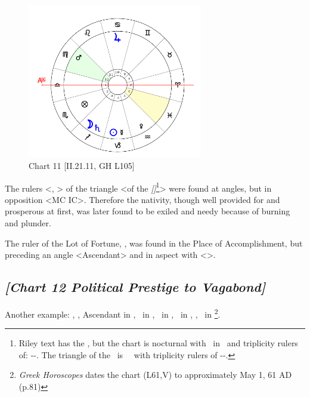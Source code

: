 \clearpage
\begin{figure}
\centering
\vspace{-20pt}
\includegraphics[width=0.68\textwidth]{charts/2_21_11}
\caption{Chart 11 [II.21.11, GH L105]}
\label{fig:chart11}
\end{figure}

The rulers <\Jupiter, \Sun> of the triangle <of the \textsl{[\Moon]}\footnote{Riley text has the \Sun, but the chart is nocturnal with \Moon\, in \Sagittarius\, and triplicity rulers of: \Sun-\Jupiter-\Saturn. The triangle of the \Sun\, is \Taurus\, \Virgo\, \Capricorn with triplicity rulers of \Venus-\Moon-\Mars.}> were found at angles, but in opposition <MC IC>. Therefore the nativity, though well provided for and prosperous at first, was later found to be exiled and needy because of burning and plunder. 

The ruler of the Lot of Fortune, \Mars, was found in the Place of Accomplishment, but preceding an angle <Ascendant> and in aspect with \Saturn <\Square>.

\newpage
\subsection*{\textit{[Chart 12 Political Prestige to Vagabond]}}

Another example: \Sun, \Venus, Ascendant in \Taurus, \Moon\, in \Aquarius, \Saturn\, in \Cancer, \Jupiter\, in \Libra, \Mars, \Mercury\, in \Gemini
\footnote{\textit{Greek Horoscopes} dates the chart (L61,V) to approximately May 1, 61 AD (p.81)}.

